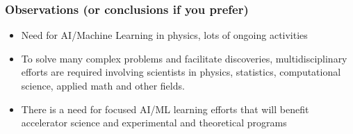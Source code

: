 \documentclass[11pt]{beamer} %
\begin{document}
\begin{frame}
\frametitle{Observations (or conclusions if you prefer)}

\begin{block}{}
\begin{itemize}
\item Need for AI/Machine Learning in physics, lots of ongoing activities

\item To solve many complex problems and facilitate discoveries, multidisciplinary efforts are required involving scientists in  physics, statistics, computational science, applied math and other fields.

\item There is a need for  focused AI/ML learning efforts that will benefit accelerator science and experimental and theoretical programs
\end{itemize}

\noindent
\end{block}
\end{frame}
\end{document}
